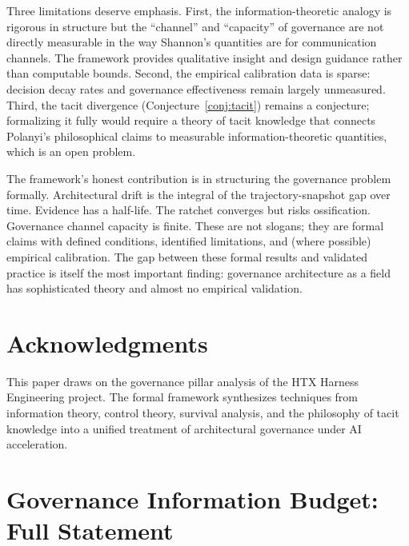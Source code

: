 \documentclass[11pt, a4paper, logo, copyright]{googledeepmind}
\begin{document}
Three limitations deserve emphasis. First, the information-theoretic analogy is rigorous in structure but the ``channel'' and ``capacity'' of governance are not directly measurable in the way Shannon's quantities are for communication channels. The framework provides qualitative insight and design guidance rather than computable bounds. Second, the empirical calibration data is sparse: decision decay rates and governance effectiveness remain largely unmeasured. Third, the tacit divergence (Conjecture~\ref{conj:tacit}) remains a conjecture; formalizing it fully would require a theory of tacit knowledge that connects Polanyi's philosophical claims to measurable information-theoretic quantities, which is an open problem.

The framework's honest contribution is in structuring the governance problem formally. Architectural drift is the integral of the trajectory-snapshot gap over time. Evidence has a half-life. The ratchet converges but risks ossification. Governance channel capacity is finite. These are not slogans; they are formal claims with defined conditions, identified limitations, and (where possible) empirical calibration. The gap between these formal results and validated practice is itself the most important finding: governance architecture as a field has sophisticated theory and almost no empirical validation.

\section*{Acknowledgments}

This paper draws on the governance pillar analysis of the HTX Harness Engineering project. The formal framework synthesizes techniques from information theory, control theory, survival analysis, and the philosophy of tacit knowledge into a unified treatment of architectural governance under AI acceleration.





\appendix

\section{Governance Information Budget: Full Statement}
\label{app:budget}
\end{document}
